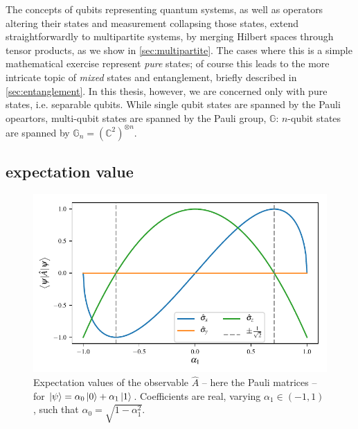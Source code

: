 {The concepts of qubits representing quantum systems, as well as operators
    altering their states and measurement collapsing those states,
    extend straightforwardly to multipartite systems, by merging Hilbert spaces through tensor products, 
    as we show in \cref{sec:multipartite}. 
The cases where this is a simple mathematical exercise represent \emph{pure} states;
    of course this leads to the more intricate topic of \emph{mixed} states and entanglement, 
    briefly described in \cref{sec:entanglement}.
In this thesis, however, we are concerned only with pure states, i.e. separable qubits.
While single qubit states are spanned by the Pauli opeartors, multi-qubit states are spanned by the Pauli group, $\mathbb{G}$: 
    $n$-qubit states are spanned by $\mathbb{G}_n = \left(\mathbb{C}^2\right)^{\otimes n}$.

\subsection{\Gls{expectation value}}\label{sec:expectation_value}
\begin{figure}
    \begin{center}
        \includegraphics{contextual_review/figures/expectation_values.pdf}
    \end{center}
    \caption[Expectation values]{
        Expectation values of the observable $\hat{A}$ -- here the Pauli matrices --  
            for $\ket{\psi} = \alpha_0 \ket{0} + \alpha_1 \ket{1}$.
            Coefficients are real, varying $\alpha_1 \in \left( -1, 1\right)$, such that $\alpha_0 = \sqrt{1 - \alpha_1^2}$. 
    }
    \label{fig:expectation_values}
\end{figure}

}
